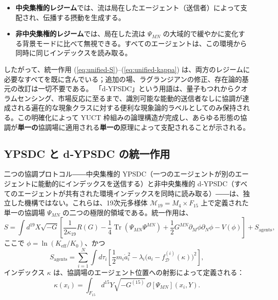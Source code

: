 \documentclass[12pt,a4paper]{article}
\DeclareMathOperator{\Tr}{Tr}
\begin{document}
	\begin{itemize}[leftmargin=*]
		\item \textbf{中央集権的レジーム}では、流は局在したエージェント（送信者）によって支配され、伝播する摂動を生成する。
		\item \textbf{非中央集権的レジーム}では、局在した流は \(\Psi_{MN}\) の大域的で緩やかに変化する背景モードに比べて無視できる。すべてのエージェントは、この環境から同時に同じインデックスを読み取る。
	\end{itemize}
	
	したがって、統一作用 (\ref{eq:unified-S})--(\ref{eq:unified-kappa}) は、両方のレジームに必要なすべてを既に含んでいる；追加の場、ラグランジアンの修正、存在論的基元の改訂は一切不要である。
	「d‑YPSDC」という用語は、量子もつれからクオラムセンシング、市場反応に至るまで、識別可能な能動的送信者なしに協調が達成される遍在的な現象クラスに対する便利な現象論的ラベルとしてのみ保持される。この明確化によって YUCT 枠組みの論理構造が完成し、あらゆる形態の協調が\textbf{単一の}協調場に適用される\textbf{単一の}原理によって支配されることが示される。
	
	\subsection{YPSDC と d‑YPSDC の統一作用}
	\label{subsec:unified-action}
	
	二つの協調プロトコル――中央集権的 YPSDC（一つのエージェントが別のエージェントに能動的にインデックスを送信する）と非中央集権的 d‑YPSDC（すべてのエージェントが共有された環境インデックスを同時に読み取る）――は、独立した機構ではない。これらは、19次元多様体 \(\mathcal{M}_{19}=M_4\times F_{15}\) 上で定義された単一の協調場 \(\Psi_{MN}\) の二つの極限的領域である。統一作用は、
	\begin{equation}
		S = \int d^{19}X \sqrt{-G} \left[ \frac{1}{2\kappa_{19}} R(G)
		- \frac{1}{4} \Tr(\Psi_{MN}\Psi^{MN}) + \frac{1}{2} G^{MN}\partial_M\phi \partial_N\phi
		- V(\phi) \right] + S_{\mathrm{agents}},
		\label{eq:unified-S}
	\end{equation}
	ここで \(\phi = \ln(K_{\mathrm{eff}}/K_0)\)、かつ
	\begin{equation}
		S_{\mathrm{agents}} = \sum_{i=1}^{N} \int d\tau_i \left[ \frac{1}{2} m_i \dot a_i^2
		- \lambda_i \bigl( a_i - f_{\mathcal{D}}^{(i)}(\kappa) \bigr)^2 \right],
		\label{eq:unified-agents}
	\end{equation}
	インデックス \(\kappa\) は、協調場のエージェント位置への射影によって定義される：
	\begin{equation}
		\kappa(x_i) = \int_{F_{15}} d^{15}Y \sqrt{-G^{(15)}}\,
		\mathcal{O}[\Psi_{MN}](x_i, Y).
		\label{eq:unified-kappa}
	\end{equation}
	
\end{document}
